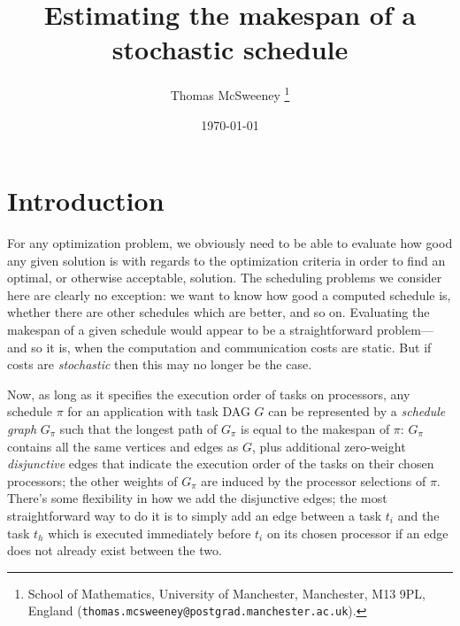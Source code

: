 \documentclass[12pt]{article}
\title{Estimating the makespan of a stochastic schedule} %
\author{Thomas McSweeney%
	\thanks{%
		School of Mathematics,
		University of Manchester,
		Manchester, M13 9PL, England
		(\texttt{thomas.mcsweeney@postgrad.manchester.ac.uk}).
	}
}
\date{\today}
\begin{document}
	\maketitle 	


\section{Introduction}
\label{sect.intro}


For any optimization problem, we obviously need to be able to evaluate how good any given solution is with regards to the optimization criteria in order to find an optimal, or otherwise acceptable, solution. The scheduling problems we consider here are clearly no exception: we want to know how good a computed schedule is, whether there are other schedules which are better, and so on. Evaluating the makespan of a given schedule would appear to be a straightforward problem---and so it is, when the computation and communication costs are static. But if costs are {\em stochastic} then this may no longer be the case.

Now, as long as it specifies the execution order of tasks on processors, any schedule $\pi$ for an application with task DAG $G$ can be represented by a {\em schedule graph} $G_{\pi}$ such that the longest path of $G_{\pi}$ is equal to the makespan of $\pi$: $G_\pi$ contains all the same vertices and edges as $G$, plus additional zero-weight {\em disjunctive} edges that indicate the execution order of the tasks on their chosen processors; the other weights of $G_\pi$ are induced by the processor selections of $\pi$. There's some flexibility in how we add the disjunctive edges; the most straightforward way to do it is to simply add an edge between a task $t_i$ and the task $t_h$ which is executed immediately before $t_i$ on its chosen processor if an edge does not already exist between the two.  
\end{document}
